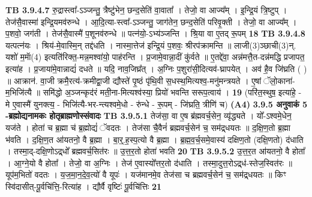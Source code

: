 \documentclass[17pt]{extarticle}
\begin{document}
{{{{{{{{{{{{{{{{{{{{{{                  \newline
                                \textbf{ TB 3.9.4.7} \newline
                  रु॒द्रास्त्वा᳚-ऽञ्जन्तु॒ त्रैष्टु॑भेन॒ छन्द॒सेति॑ वा॒वाता᳚ । तेजो॒ वा आज्य᳚म् । इ॒न्द्रि॒यं त्रि॒ष्टुप् । तेज॑सै॒वास्मा॑ इन्द्रि॒यमव॑रुन्धे । आ॒दि॒त्या-स्त्वा᳚-ऽञ्जन्तु॒ जाग॑तेन॒ छन्द॒सेति॑ परिवृ॒क्ती । तेजो॒ वा आज्य᳚म् । प॒शवो॒ जग॑ती । तेज॑सै॒वास्मै॑ प॒शूनव॑रुन्धे ॥ पत्न॑यो॒-ऽभ्य॑ञ्जन्ति । श्रि॒या वा ए॒तद् रू॒पम् \textbf{ 18} \newline
                  \newline
                                \textbf{ TB 3.9.4.8} \newline
                  यत्पत्न॑यः । श्रिय॑-मे॒वास्मि॒न् तद्द॑धति । नास्मा॒त्तेज॑ इन्द्रि॒यं प॒शवः॒ श्रीरप॑क्रामन्ति ॥ लाजी(3)ञ्छाची(3)न्. यशो॑ म॒माॅ(4) इत्यति॑रिक्त॒-मन्न॒मश्वा॑यो॒ पाह॑रन्ति । प्र॒जामे॒वान्ना॒दीं कु॑र्वते ॥ ए॒तद्दे॑वा॒ अन्न॑मत्तै॒त-दन्न॑मद्धि प्रजापत॒ इत्या॑ह । प्र॒जाया॑मे॒वान्नाद्यं॑ दधते ॥ यदि॒ नाव॒जिघ्र᳚त् । अ॒ग्निः प॒शुरा॑सी॒दित्यव॑-घ्रापयेत् । अव॑ है॒व जि॑घ्रति ( ) ॥ आक्रान॑. वा॒जी क्रमै॒रत्य॑-क्रमीद्वा॒जी द्यौस्ते॑ पृ॒ष्ठं पृ॑थि॒वी स॒धस्थ॒मित्यश्व॒-मनु॑मन्त्रयते । ए॒षां ॅलो॒काना॑-म॒भिजि॑त्यै ॥ समि॑द्धो अ॒ञ्जन्कृद॑रं मती॒ना-मित्यश्व॑स्या॒ प्रियो॑ भवन्ति सरूप॒त्वाय॑ । \textbf{ 19} \newline
                  \newline
                                    (परि॑त॒स्थुष॒ इत्या॑हे॒ - मे ए॒वास्मै॑ युनक्त्य॒ - भिजि॑त्यै-भर-न्त्यश्वमे॒धो - रु॑न्धे - रू॒पम् - जि॑घ्रति॒ त्रीणि॑ च) \textbf{(A4)} \newline \newline
                \textbf{ 3.9.5     अनुवाकं   5 -ब्रह्मोद्यनामकः होतृब्राह्मणोस्संवादः} \newline
                                \textbf{ TB 3.9.5.1} \newline
                  तेज॑सा॒ वा ए॒ष ब्र॑ह्मवर्च॒सेन॒ व्यृ॑द्ध्यते । यो᳚-ऽश्वमे॒धेन॒ यज॑ते । होता॑ च ब्र॒ह्मा च॑ ब्र॒ह्मोद्यं॑ ॅवदतः । तेज॑सा चै॒वैनं॑ ब्रह्मवर्च॒सेन॑ च॒ सम॑द्र्धयतः ॥ द॒क्षि॒ण॒तो ब्र॒ह्मा भ॑वति । द॒क्षि॒ण॒त आ॑यतनो॒ वै ब्र॒ह्मा । बा॒र्॒.ह॒स्प॒त्यो वै ब्र॒ह्मा । ब्र॒ह्म॒व॒र्च॒समे॒वास्य॑ दक्षिण॒तो (दक्षि॒णतो) द॑धाति । तस्मा॒द्-दक्षि॒णोऽद्र्धो᳚ ब्रह्मवर्च॒सित॑रः ॥ उ॒त्त॒र॒तो होता॑ भवति \textbf{ 20} \newline
                  \newline
                                \textbf{ TB 3.9.5.2} \newline
                  उ॒त्त॒र॒त आ॑यतनो॒ वै होता᳚ । आ॒ग्ने॒यो वै होता᳚ । तेजो॒ वा अ॒ग्निः । तेज॑ ए॒वास्यो᳚त्तर॒तो द॑धाति । तस्मा॒दुत्त॒रोऽद्र्ध॑-स्तेज॒स्वित॑रः ॥ यूप॑म॒भितो॑ वदतः । य॒ज॒मा॒न॒दे॒व॒त्यो॑ वै यूपः॑ । यज॑मानमे॒व तेज॑सा च ब्रह्मवर्च॒सेन॑ च॒ सम॑द्र्धयतः ॥ किꣳ स्वि॑दासीत्-पू॒र्वचि॑त्ति॒-रित्या॑ह । द्यौर्वै वृष्टिः॑ पू॒र्वचि॑त्तिः \textbf{ 21} \newline
}}}}}}}}}}}}}}}}}}}}}}
\end{document}
